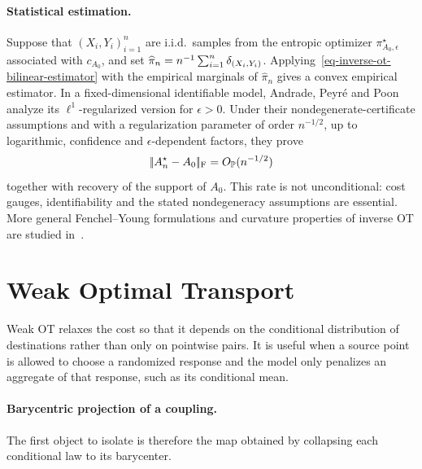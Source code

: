 \paragraph{Statistical estimation.}
Suppose that $(X_i,Y_i)_{i=1}^n$ are i.i.d.\ samples from the entropic optimizer $\pi_{A_0,\epsilon}^\star$ associated with $c_{A_0}$, and set $\widehat\pi_n=n^{-1}\sum_{i=1}^n\delta_{(X_i,Y_i)}$. Applying~\eqref{eq-inverse-ot-bilinear-estimator} with the empirical marginals of $\widehat\pi_n$ gives a convex empirical estimator. In a fixed-dimensional identifiable model, Andrade, Peyr\'e and Poon~\cite{andrade2024sparsistency} analyze its $\ell^1$-regularized version for $\epsilon>0$. Under their nondegenerate-certificate assumptions and with a regularization parameter of order $n^{-1/2}$, up to logarithmic, confidence and $\epsilon$-dependent factors, they prove
\[
	|\!| A_n^\star-A_0 |\!|_{\mathrm F}=O_{\mathbb{P}}(n^{-1/2})
\]
together with recovery of the support of $A_0$. This rate is not unconditional: cost gauges, identifiability and the stated nondegeneracy assumptions are essential. More general Fenchel--Young formulations and curvature properties of inverse OT are studied in~\cite{andrade2025sharpened,peyre2026curvature}.


\section{Weak Optimal Transport}
\label{sec-weak-ot}

Weak OT relaxes the cost so that it depends on the conditional distribution of destinations rather than only on pointwise pairs. It is useful when a source point is allowed to choose a randomized response and the model only penalizes an aggregate of that response, such as its conditional mean.

\paragraph{Barycentric projection of a coupling.}
The first object to isolate is therefore the map obtained by collapsing each conditional law to its barycenter.

